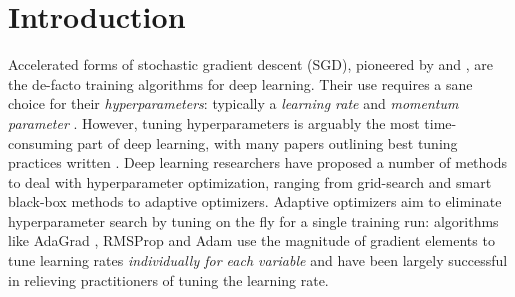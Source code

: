 \documentclass{article}
\newcommand{\yell}[1]{#1}
\begin{document}
\section{Introduction}
Accelerated forms of stochastic gradient descent (SGD), pioneered by
\citet{polyak1964some} and \citet{nesterov1983method}, are the de-facto
training algorithms for deep learning.
Their use requires a sane choice for their {\em hyperparameters}: 
typically a {\em learning rate} and {\em momentum parameter} \citep{sutskever2013importance}.
However, tuning hyperparameters is arguably the most time-consuming part of deep learning, with many papers outlining best tuning practices written
\citep{bengio2012practical,orr2003neural,bengio2012deep,bottou2012stochastic}.
Deep learning researchers have proposed a number of methods to deal with hyperparameter optimization, ranging from grid-search and 
smart black-box methods \citep{bergstra2012random,snoek2012practical}
to adaptive optimizers.
Adaptive optimizers aim to eliminate hyperparameter search by tuning on the fly for a single training run:
algorithms like AdaGrad \citep{duchi2011adaptive}, RMSProp \citep{tieleman2012lecture} and Adam \citep{kingma2014adam} use the magnitude of gradient elements to tune learning rates {\em individually for each variable} and  have been largely successful in relieving practitioners of tuning the learning rate. 
\end{document}
